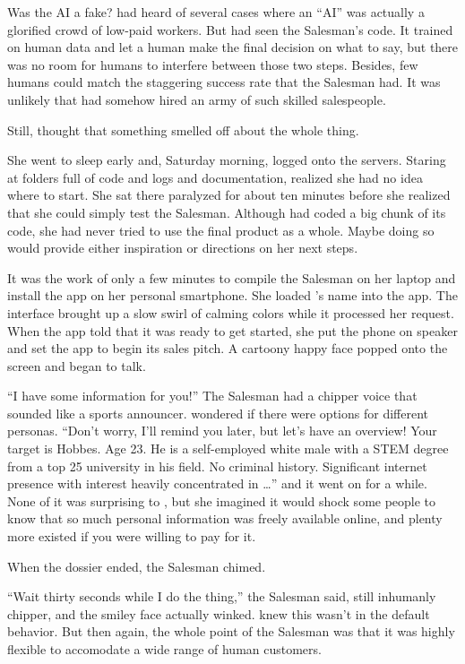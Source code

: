 Was the AI a fake? {\protag} had heard of several cases where an ``AI'' was actually a glorified crowd of low-paid workers. But {\protag} had seen the Salesman's code. It trained on human data and let a human make the final decision on what to say, but there was no room for humans to interfere between those two steps. Besides, few humans could match the staggering success rate that the Salesman had. It was unlikely that {\energyCompany} had somehow hired an army of such skilled salespeople.

Still, {\protag} thought that something smelled off about the whole thing.

She went to sleep early and, Saturday morning, logged onto the servers. Staring at folders full of code and logs and documentation, {\protag} realized she had no idea where to start.  She sat there paralyzed for about ten minutes before she realized that she could simply test the Salesman. Although {\protag} had coded a big chunk of its code, she had never tried to use the final product as a whole. Maybe doing so would provide either inspiration or directions on her next steps.

It was the work of only a few minutes to compile the Salesman on her laptop and install the app on her personal smartphone. She loaded {\sidetag}'s name into the app. The interface brought up a slow swirl of calming colors while it processed her request. When the app told {\protag} that it was ready to get started, she put the phone on speaker and set the app to begin its sales pitch. A cartoony happy face popped onto the screen and began to talk.

``I have some information for you!'' The Salesman had a chipper voice that sounded like a sports announcer. {\protag} wondered if there were options for different personas. ``Don't worry, I'll remind you later, but let's have an overview! Your target is {\sidetag} Hobbes. Age 23. He is a self-employed white male with a STEM degree from a top 25 university in his field. No criminal history. Significant internet presence with interest heavily concentrated in \dots'' and it went on for a while. None of it was surprising to {\protag}, but she imagined it would shock some people to know that so much personal information was freely available online, and plenty more existed if you were willing to pay for it.

When the dossier ended, the Salesman chimed.

``Wait thirty seconds while I do the thing,'' the Salesman said, still inhumanly chipper, and the smiley face actually winked. {\protag} knew this wasn't in the default behavior. But then again, the whole point of the Salesman was that it was highly flexible to accomodate a wide range of human customers.

